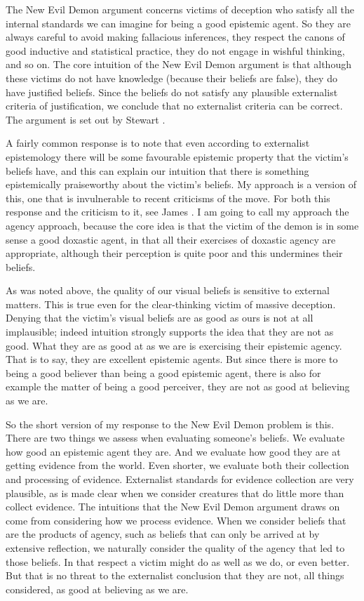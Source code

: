 The New Evil Demon argument concerns victims of deception who satisfy all the internal standards we can imagine for being a good epistemic agent. So they are always careful to avoid making fallacious inferences, they respect the canons of good inductive and statistical practice, they do not engage in wishful thinking, and so on. The core intuition of the New Evil Demon argument is that although these victims do not have knowledge (because their beliefs are false), they do have justified beliefs. Since the beliefs do not satisfy any plausible externalist criteria of justification, we conclude that no externalist criteria can be correct. The argument is set out by Stewart \citet{Cohen1984}.

A fairly common response is to note that even according to externalist epistemology there will be some favourable epistemic property that the victim's beliefs have, and this can explain our intuition that there is something epistemically praiseworthy about the victim's beliefs. My approach is a version of this, one that is invulnerable to recent criticisms of the move. For both this response and the criticism to it, see James \citet{Pryor2001-PRYHOR}. I am going to call my approach the agency approach, because the core idea is that the victim of the demon is in some sense a good doxastic agent, in that all their exercises of doxastic agency are appropriate, although their perception is quite poor and this undermines their beliefs.

As was noted above, the quality of our visual beliefs is sensitive to external matters. This is true even for the clear-thinking victim of massive deception. Denying that the victim's visual beliefs are as good as ours is not at all implausible; indeed intuition strongly supports the idea that they are not as good. What they are as good at as we are is exercising their epistemic agency. That is to say, they are excellent epistemic agents. But since there is more to being a good believer than being a good epistemic agent, there is also for example the matter of being a good perceiver, they are not as good at believing as we are. 

So the short version of my response to the New Evil Demon problem is this. There are two things we assess when evaluating someone's beliefs. We evaluate how good an epistemic agent they are. And we evaluate how good they are at getting evidence from the world. Even shorter, we evaluate both their collection and processing of evidence. Externalist standards for evidence collection are very plausible, as is made clear when we consider creatures that do little more than collect evidence. The intuitions that the New Evil Demon argument draws on come from considering how we process evidence. When we consider beliefs that are the products of agency, such as beliefs that can only be arrived at by extensive reflection, we naturally consider the quality of the agency that led to those beliefs. In that respect a victim might do as well as we do, or even better. But that is no threat to the externalist conclusion that they are not, all things considered, as good at believing as we are.

